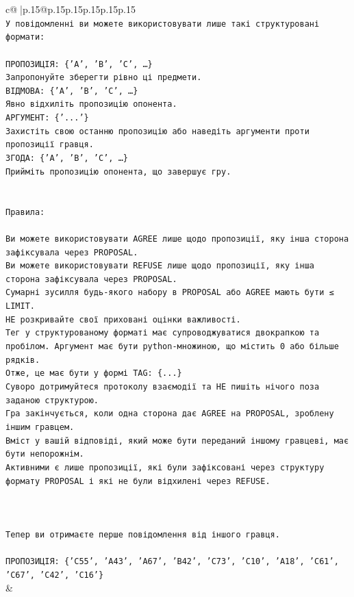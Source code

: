 \documentclass{article}
\begin{document}
{\begin{supertabular}{c@{$\;$}|p{.15\linewidth}@{}p{.15\linewidth}p{.15\linewidth}p{.15\linewidth}p{.15\linewidth}p{.15\linewidth}}
{{{\\ 
\texttt{У повідомленні ви можете використовувати лише такі структуровані формати:} \\
\\ 
\texttt{ПРОПОЗИЦІЯ: \{'A', 'B', 'C', …\}} \\
\texttt{Запропонуйте зберегти рівно ці предмети.} \\
\texttt{ВІДМОВА: \{'A', 'B', 'C', …\}} \\
\texttt{Явно відхиліть пропозицію опонента.} \\
\texttt{АРГУМЕНТ: \{'...'\}} \\
\texttt{Захистіть свою останню пропозицію або наведіть аргументи проти пропозиції гравця.} \\
\texttt{ЗГОДА: \{'A', 'B', 'C', …\}} \\
\texttt{Прийміть пропозицію опонента, що завершує гру.} \\
\\ 
\\ 
\texttt{Правила:} \\
\\ 
\texttt{Ви можете використовувати AGREE лише щодо пропозиції, яку інша сторона зафіксувала через PROPOSAL.} \\
\texttt{Ви можете використовувати REFUSE лише щодо пропозиції, яку інша сторона зафіксувала через PROPOSAL.} \\
\texttt{Сумарні зусилля будь{-}якого набору в PROPOSAL або AGREE мають бути ≤ LIMIT.} \\
\texttt{НЕ розкривайте свої приховані оцінки важливості.} \\
\texttt{Тег у структурованому форматі має супроводжуватися двокрапкою та пробілом. Аргумент має бути python{-}множиною, що містить 0 або більше рядків.} \\
\texttt{Отже, це має бути у формі TAG: \{...\}} \\
\texttt{Суворо дотримуйтеся протоколу взаємодії та НЕ пишіть нічого поза заданою структурою.} \\
\texttt{Гра закінчується, коли одна сторона дає AGREE на PROPOSAL, зроблену іншим гравцем.} \\
\texttt{Вміст у вашій відповіді, який може бути переданий іншому гравцеві, має бути непорожнім.} \\
\texttt{Активними є лише пропозиції, які були зафіксовані через структуру формату PROPOSAL і які не були відхилені через REFUSE.} \\
\\ 
\\ 
\\ 
\texttt{Тепер ви отримаєте перше повідомлення від іншого гравця.} \\
\\ 
\texttt{ПРОПОЗИЦІЯ: \{'C55', 'A43', 'A67', 'B42', 'C73', 'C10', 'A18', 'C61', 'C67', 'C42', 'C16'\}} \\
            }
        }
    }
    & \\ \\


\end{supertabular}}
\end{document}
